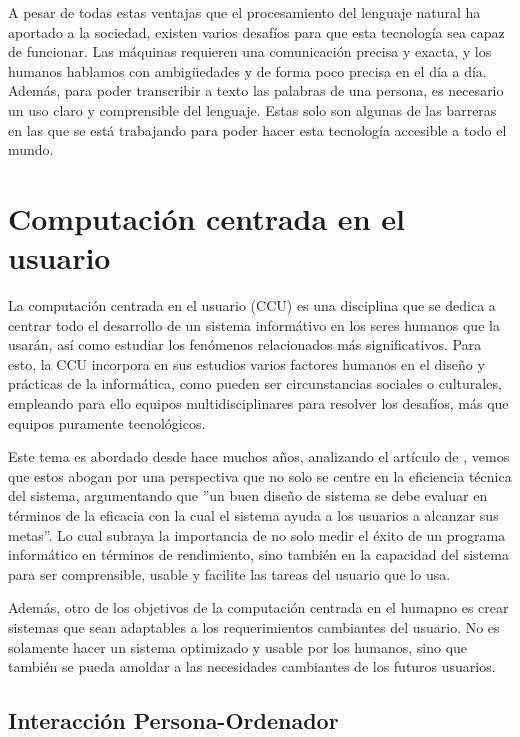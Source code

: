 A pesar de todas estas ventajas que el procesamiento del lenguaje natural ha aportado a la sociedad, existen varios desafíos para que esta tecnología sea capaz de funcionar. Las máquinas requieren una comunicación precisa y exacta, y los humanos hablamos con ambigüedades y de forma poco precisa en el día a día. Además, para poder transcribir a texto las palabras de una persona, es necesario un uso claro y comprensible del lenguaje. Estas solo son algunas de las barreras en las que se está trabajando para poder hacer esta tecnología accesible a todo el mundo.


\section{Computación centrada en el usuario}

La computación centrada en el usuario (CCU) es una disciplina que se dedica a  centrar todo el desarrollo de un sistema informátivo en los seres humanos que la usarán, así como estudiar los fenómenos relacionados más significativos. Para esto, la CCU incorpora en sus estudios varios factores humanos en el diseño y prácticas de la informática, como pueden ser circunstancias sociales o culturales, empleando para ello equipos multidisciplinares para resolver los desafíos, más que equipos puramente tecnológicos.

Este tema es abordado desde hace muchos años, analizando el artículo de \cite{Card1983ThePO}, vemos que estos abogan por una perspectiva que no solo se centre en la eficiencia técnica del sistema, argumentando que ''un buen diseño de sistema se debe evaluar en términos de la eficacia con la cual el sistema ayuda a los usuarios a alcanzar sus metas''. Lo cual subraya la importancia de no solo medir el éxito de un programa informático en términos de rendimiento, sino también en la capacidad del sistema para ser comprensible, usable y facilite las tareas del usuario que lo usa.

Además, otro de los objetivos de la computación centrada en el humapno es crear sistemas que sean adaptables a los requerimientos cambiantes del usuario. No es solamente hacer un sistema optimizado y usable por los humanos, sino que también se pueda amoldar a las necesidades cambiantes de los futuros usuarios.

\subsection{Interacción Persona-Ordenador }

